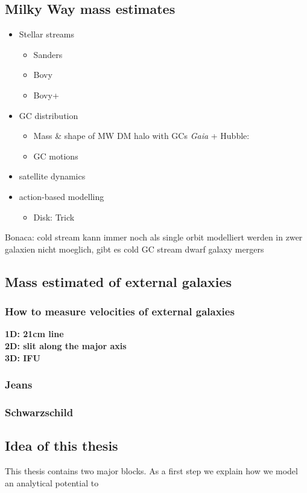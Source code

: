\subsection{Milky Way mass estimates}
\begin{itemize}
    \item Stellar streams
    \begin{itemize}
        \item Sanders \citep{Streams...Sanders...2014}
        \item Bovy \citep{Streams...Bovy...2014}
        \item Bovy+ \citep{Streams..GD1..Pal5...Bovy...2016}
    \end{itemize}
    \item \ac{GC} distribution 
    \begin{itemize}
        \item Mass \& shape of \ac{MW} \ac{DM} halo with \acp{GC} \textit{Gaia} + Hubble: \cite{Posti...MWmassGCs...2018}
        \item GC motions \citep{MWmass...GCmotions...Watkins...2018}
    \end{itemize}
    \item satellite dynamics \citep{MWmass...sat...dyn}
    \item action-based modelling
    \begin{itemize}
        \item Disk: Trick \citep{Wilmathesis}

    \end{itemize}
    
\end{itemize}


   
Bonaca: cold stream kann immer noch als single orbit modelliert werden 
in zwer galaxien nicht moeglich, gibt es cold GC stream dwarf galaxy mergers


\subsection{Mass estimated of external galaxies}
\subsubsection{How to measure velocities of external galaxies}
\textbf{1D: 21cm line}\\
\textbf{2D: slit along the major axis}\\
\textbf{3D: \ac{IFU}}
\subsubsection{Jeans}
\subsubsection{Schwarzschild}

\subsection{Idea of this thesis}
This thesis contains two major blocks. As a first step we explain how we model an analytical potential to 